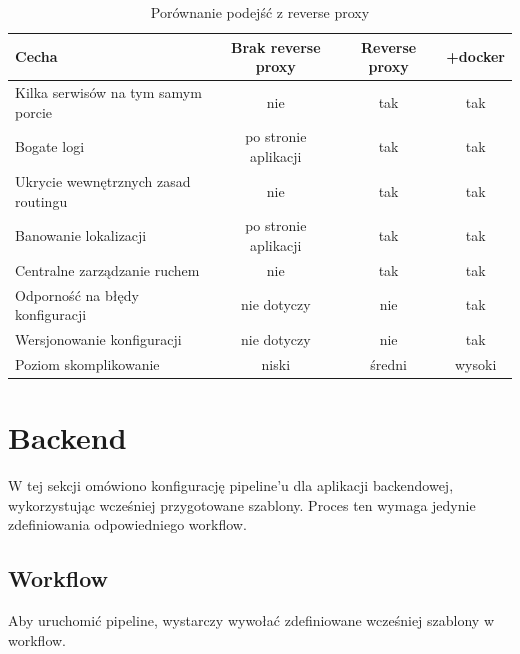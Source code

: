 \documentclass{article}
\begin{document}
\begin{table}[H]
\centering
\begin{tabular}{|l|c|c|c|}
\hline
\textbf{Cecha} & \textbf{Brak reverse proxy} & \textbf{Reverse proxy} & \textbf{+docker} \\ \hline
Kilka serwisów na tym samym porcie & \cellcolor{red!50}nie & \cellcolor{green!50}tak & \cellcolor{green!50}tak \\ \hline
Bogate logi  & \cellcolor{yellow!50}po stronie aplikacji & \cellcolor{green!50}tak & \cellcolor{green!50}tak \\ \hline
Ukrycie wewnętrznych zasad routingu & \cellcolor{red!50}nie & \cellcolor{green!50}tak & \cellcolor{green!50}tak \\ \hline
Banowanie lokalizacji & \cellcolor{yellow!50}po stronie aplikacji & \cellcolor{green!50}tak & \cellcolor{green!50}tak \\ \hline
Centralne zarządzanie ruchem & \cellcolor{red!50}nie & \cellcolor{green!50}tak & \cellcolor{green!50}tak \\ \hline
Odporność na błędy konfiguracji & \cellcolor{yellow!50}nie dotyczy & \cellcolor{red!50}nie & \cellcolor{green!50}tak \\ \hline
Wersjonowanie konfiguracji & \cellcolor{yellow!50}nie dotyczy & \cellcolor{red!50}nie & \cellcolor{green!50}tak \\ \hline
Poziom skomplikowanie & \cellcolor{green!50}niski & \cellcolor{yellow!50}średni & \cellcolor{red!50}wysoki \\ \hline
\end{tabular}
\caption{Porównanie podejść z reverse proxy}
\label{tab:porownanie-metod-wdrazania}
\end{table}

\section{Backend}

W tej sekcji omówiono konfigurację pipeline’u dla aplikacji backendowej, wykorzystując wcześniej przygotowane szablony. Proces ten wymaga jedynie zdefiniowania odpowiedniego workflow.


\subsection{Workflow}

Aby uruchomić pipeline, wystarczy wywołać zdefiniowane wcześniej szablony w workflow. 
\end{document}
